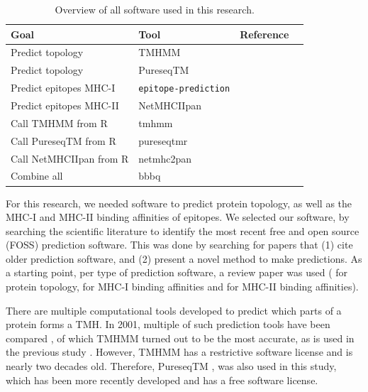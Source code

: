 \begin{table}[]
  \begin{tabular}{llll}
    Goal & Tool & Reference \\ 
    \hline
    Predict topology                  & TMHMM                     & \cite{krogh2001predicting} \\
    Predict topology                  & PureseqTM                 & \cite{wang2019efficient} \\
    Predict epitopes MHC-I            & \verb;epitope-prediction; & \cite{bianchi2017} \\
    Predict epitopes MHC-II           & NetMHCIIpan               & \cite{nielsen2008quantitative,karosiene2013netmhciipan} \\
    Call TMHMM from R                 & tmhmm                     & \cite{tmhmm} \\
    Call PureseqTM from R             & pureseqtmr                & \cite{pureseqtmr} \\
    Call NetMHCIIpan from R           & netmhc2pan                & \cite{netmhc2pan} \\
    Combine all                       & bbbq                      & \cite{bbbq}
  \end{tabular}
  \caption{
    Overview of all software used in this research.
  }
  \label{table:software_used}
\end{table}


For this research, we needed software to predict protein
topology, as well as the MHC-I and MHC-II binding affinities
of epitopes. We selected our software, by
searching the scientific literature 
to identify the most recent free and open source (FOSS) 
prediction software.
This was done by searching for papers that (1) cite older
prediction software, and (2) present a novel method to make predictions.
As a starting point, per type of prediction software,
a review paper was used (\cite{moller2001evaluation} for protein
topology, \cite{lundegaard2011prediction} for MHC-I
binding affinities and \cite{nielsen2003reliable} for MHC-II binding
affinities). 


There are multiple computational tools developed to predict which
parts of a protein forms a TMH.
In 2001, multiple of such prediction tools have been compared \cite{moller2001evaluation},
of which TMHMM \cite{krogh2001predicting} turned out to be the most accurate, 
as is used in the previous study \cite{bianchi2017}.
However, TMHMM has a restrictive software license and is nearly two
decades old.
Therefore, PureseqTM \cite{wang2019efficient},
was also used in this study, which has been more recently developed
and has a free software license.

